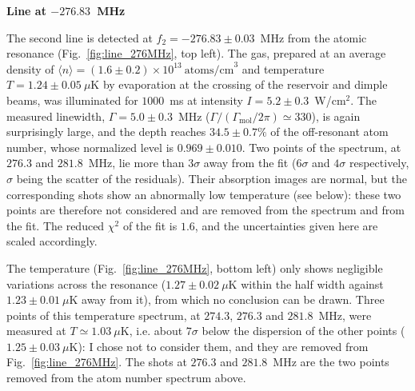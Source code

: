 \textbf{Line at $-276.83$~MHz}

The second line is detected at $f_2 = -276.83\pm0.03$~MHz from the atomic
resonance (Fig.~\ref{fig:line_276MHz}, top left). The gas, prepared at an average
density of $\langle n\rangle = (1.6\pm0.2)\times10^{13}~\text{atoms/cm}^3$ and temperature $T=1.24\pm0.05~\mu$K by evaporation at
the crossing of the reservoir and dimple beams, was illuminated for $1000$~ms at
intensity $I = 5.2\pm0.3$~W/cm$^2$. The measured linewidth,
$\Gamma=5.0\pm0.3$~MHz ($\Gamma/(\Gamma_{\text{mol}}/2\pi) \simeq 330$), is again
surprisingly large, and the depth reaches $34.5\pm0.7\%$ of the off-resonant atom number,
whose normalized level is $0.969\pm0.010$. Two points of the spectrum, at $276.3$ and
$281.8$~MHz, lie more than $3\sigma$ away from the fit ($6\sigma$ and $4\sigma$ respectively,
$\sigma$ being the scatter of the residuals). Their absorption images are normal, but the
corresponding shots show an abnormally low temperature (see below): these two points are
therefore not considered and are removed from the spectrum and from the fit. The reduced
$\chi^2$ of the fit is $1.6$, and the uncertainties given here are scaled accordingly.

The temperature (Fig.~\ref{fig:line_276MHz}, bottom left) only shows negligible variations
across the resonance ($1.27\pm0.02~\mu$K within the half width against $1.23\pm0.01~\mu$K
away from it), from which no conclusion can be drawn. Three points of this temperature spectrum, at $274.3$,
$276.3$ and $281.8$~MHz, were measured at $T\simeq1.03~\mu$K, i.e. about $7\sigma$ below the
dispersion of the other points ($1.25\pm0.03~\mu$K): I chose not to consider them, and they
are removed from Fig.~\ref{fig:line_276MHz}. The shots at $276.3$ and $281.8$~MHz are
the two points removed from the atom number spectrum above.

